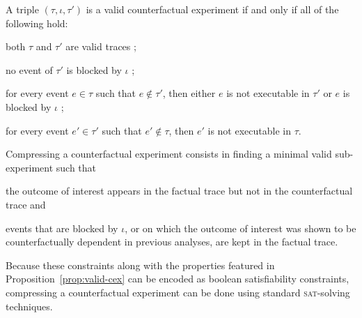 \begin{proposition}%
  \label{prop:valid-cex}
  A triple $(\tau, \iota, \tau')$ is a valid counterfactual experiment
  if and only if all of the following hold:
  \begin{inparaenum}[(1)]
  \item \label{valid-cex:valid-traces} both $\tau$ and $\tau'$ are
    valid traces ;
  \item \label{valid-cex:no-blocking} no event of $\tau'$ is blocked
    by $\iota$ ;
  \item \label{valid-cex:co-occur} for every event $e \in \tau$ such
    that $e \notin \tau'$, then either $e$ is not executable in
    $\tau'$ or $e$ is blocked by $\iota$ ;
  \item \label{valid-cex:co-occur2} for every event $e' \in \tau'$
    such that $e' \notin \tau$, then $e'$ is not executable in $\tau$.
  \end{inparaenum}
\end{proposition}

\noindent Compressing a counterfactual experiment consists in finding
a minimal valid sub-experiment such that
\begin{inparaenum}[(i)]
\item the outcome of interest appears in the factual trace but not in
  the counterfactual trace and
\item events that are blocked by $\iota$, or on which the outcome of
  interest was shown to be counterfactually dependent in previous
  analyses, are kept in the factual trace.
\end{inparaenum}
Because these constraints along with the properties featured in
Proposition~\ref{prop:valid-cex} can be encoded as boolean
satisfiability constraints, compressing a counterfactual experiment
can be done using standard \textsc{sat}-solving techniques.

